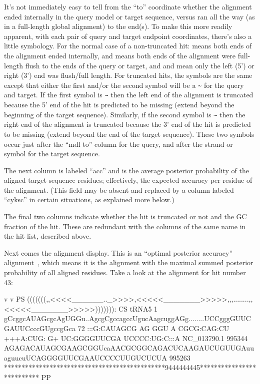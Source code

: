It's not immediately easy to tell from the ``to'' coordinate whether
the alignment ended internally in the query model or target sequence,
versus ran all the way (as in a full-length global alignment) to the
end(s). To make this more readily apparent, with each pair of query
and target endpoint coordinates, there's also a little symbology. For
the normal case of a non-truncated hit:  means both ends of
the alignment ended internally, and \otext{[]} means both ends of the
alignment were full-length flush to the ends of the query or target,
and \otext{[.}  and \otext{.]} mean only the left (5') or right (3') end
was flush/full length. For truncated hits, the symbols are the same
except that either the first and/or the second symbol will be a
\verb+~+ for the query and target. If the first symbol is \verb+~+
then the left end of the alignment is truncated because the 5' end of
the hit is predicted to be missing (extend beyond the beginning of the
target sequence). Similarly, if the second symbol is \verb+~+ then the
right end of the alignment is truncated because the 3' end of the hit
is predicted to be missing (extend beyond the end of the target
sequence). These two symbols occur just after the ``mdl to'' column for
the query, and after the strand \otext{+} or \otext{-} symbol for the
target sequence.

The next column is labeled ``acc'' and is the average posterior
probability of the aligned target sequence residues; effectively, the
expected accuracy per residue of the alignment. (This field may be
absent and replaced by a column labeled ``cyksc'' in certain
situations, as explained more below.)

The final two columns indicate whether the hit is truncated or not and
the GC fraction of the hit. These are redundant with the columns of
the same name in the hit list, described above.

Next comes the alignment display. This is an ``optimal
posterior accuracy'' alignment~\citep{Holmes98}, which means it is the
alignment with the maximal summed posterior probability of all
aligned residues. Take a look at the alignment for hit number 43:

\begin{sreoutput}
                                 v         v                                                            PS
                     (((((((,,<<<<______.._>>>>,<<<<<_______>>>>>,,,........,,<<<<<_______>>>>>))))))): CS
        tRNA5      1 gCcggcAUAGcgcAgUGGu..AgcgCgccagccUgucAagcuggAGg........UCCgggGUUCGAUUCcccGUgccgGca 72    
                     :::G:CAUAGCG AG GGU  A CGCG:CAG:CU +++A:CUG: G+        UC:GGGGUUCGA UCCCC:UG:C:::A
  NC_013790.1 995344 AGAGACAUAGCGAAGCGGUcaAACGCGGCAGACUCAAGAUCUGUUGAuuaguucuUCAGGGGUUCGAAUCCCCUUGUCUCUA 995263
                     **********************************************9444444445************************** PP
\end{sreoutput}

